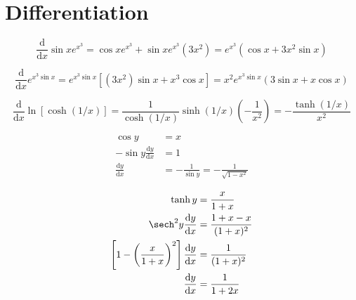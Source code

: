\documentclass[12pt]{article}
\begin{document}
\pagebreak
\section*{Differentiation}




\begin{equation}
    \frac{\mathrm{d}}{\mathrm{d}x} \sin{x} e^{x^3} = \cos{x} e^{x^3} + \sin{x} e^{x^3} (3x^{2}) = e^{x^3}(\cos{x} + 3x^{2} \sin{x})
\end{equation}

\begin{equation}
    \frac{\mathrm{d}}{\mathrm{d}x} e^{x^3 \sin{x}} = e^{x^3 \sin{x}} \left[ (3x^{2}) \sin{x} + x^3 \cos{x} \right] = x^{2} e^{x^3 \sin{x}} \left( 3\sin{x} + x \cos{x} \right)
\end{equation}

\begin{equation}
    \frac{\mathrm{d}}{\mathrm{d}x} \ln{[\cosh{(1/x)}]} = \frac{1}{\cosh{(1/x)}} \sinh{(1/x)} \left( -\frac{1}{x^{2}} \right) = -\frac{\tanh{(1/x)}}{x^{2}}
\end{equation}


\begin{equation}
    \begin{split}
        \cos{y} &= x \\
        -\sin{y} \frac{\mathrm{d}y}{\mathrm{d}x} &= 1 \\
        \frac{\mathrm{d}y}{\mathrm{d}x} &= -\frac{1}{\sin{y}} = -\frac{1}{\sqrt{1 - x^{2}}}
    \end{split}
\end{equation}

\begin{equation}
    \begin{split}
        \tanh{y} &= \frac{x}{1 + x} \\
        \sech^{2}{y} \frac{\mathrm{d}y}{\mathrm{d}x} &= \frac{1 + x - x}{(1 + x)^{2}} \\
        \left[ 1 - \left( \frac{x}{1 + x} \right)^{2} \right] \frac{\mathrm{d}y}{\mathrm{d}x} &= \frac{1}{(1 + x)^{2}} \\
        \frac{\mathrm{d}y}{\mathrm{d}x} &= \frac{1}{1 + 2x}
    \end{split}
\end{equation}

\end{document}

